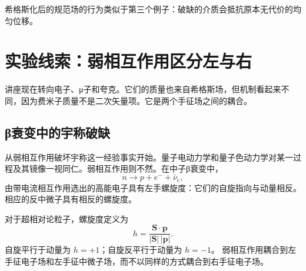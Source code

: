 希格斯化后的规范场的行为类似于第三个例子：破缺的介质会抵抗原本无代价的均匀位移。

\begin{classroomqa}
\end{classroomqa}

\begin{classroomqa}
\end{classroomqa}

\section{实验线索：弱相互作用区分左与右}

讲座现在转向电子、{\proseunicodefont μ}子和夸克。它们的质量也来自希格斯场，但机制看起来不同，因为费米子质量不是二次矢量项。它是两个手征场之间的耦合。

\subsection{{\proseunicodefont β}衰变中的宇称破缺}

从弱相互作用破坏宇称这一经验事实开始。量子电动力学和量子色动力学对某一过程及其镜像一视同仁。弱相互作用则不然。在中子{\proseunicodefont β}衰变中，\begin{equation}
  n\longrightarrow p+e^-+\bar\nu_e,
  \label{eq:l09-beta-decay}
\end{equation}
由带电流相互作用选出的高能电子具有左手螺旋度：它们的自旋指向与动量相反。相应的反中微子具有相反的螺旋度。

对于超相对论粒子，螺旋度定义为
\begin{equation}
  h=\frac{\bm S\cdot\bm p}{|\bm S|\,|\bm p|}.
\end{equation}
自旋平行于动量为 \(h=+1\)；自旋反平行于动量为 \(h=-1\)。
弱相互作用耦合到左手征电子场和左手征中微子场，而不以同样的方式耦合到右手征电子场。

